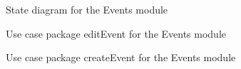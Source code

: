 \documentclass{article}
\begin{document}
			\begin{figure}[H]
				
				\caption{State diagram for the Events module}
				
			\end{figure}
		
			\begin{figure}[H]
				
				\caption{Use case package editEvent for the Events module}
				
			\end{figure}
		
			\begin{figure}[H]
				
				\caption{Use case package createEvent for the Events module}
				
			\end{figure}
		
\end{document}
